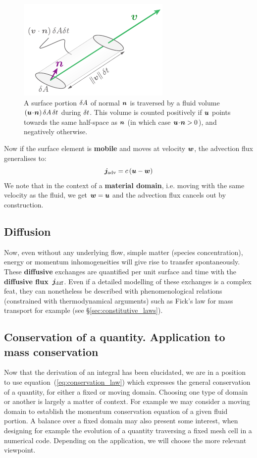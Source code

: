 \begin{figure}[htbp]
\begin{center}
\includegraphics{./pics/slanted_cylinder.pdf}
\caption{A surface portion $\delta A$ of normal $\bn$ is traversed by a fluid volume $\lp\bu \!\cdot\!\bn\rp\delA\,\delt$ during $\delta t$. This volume is counted positively if  $\bu$ points towards the same half-space as $\bn$ (in which case $\bu \!\cdot\! \bn > 0$), and negatively otherwise.}
\label{fig:slanted_cylinder}
\end{center}
\end{figure}
Now if the surface element is \textbf{mobile} and moves at velocity $\bw$, the advection flux generalises to: 
 \begin{equation}
\bj_\text{adv} = c\, (\bu-\bw)
\end{equation}
We note that in the context of a \textbf{material domain}, i.e. moving with the same velocity as the fluid, we get $\bw = \bu$ and the advection flux cancels out by construction.
\subsection{Diffusion}
Now, even without any underlying flow, simple matter (species concentration), energy or momentum inhomogeneities will give rise to transfer spontaneously. These \textbf{diffusive} exchanges are quantified per unit surface and time with the \textbf{diffusive flux}~$\bj_\text{diff}$. 
Even if a detailed modelling of these exchanges is a complex feat, they can nonetheless be described with phenomenological relations (constrained with thermodynamical arguments) such as Fick's law for mass transport for example (see \S\ref{sec:constitutive_laws}).

\subsection{Conservation of a quantity. Application to mass conservation}
Now that the derivation of an integral has been elucidated, we are in a position to use equation~(\ref{eq:conservation_law}) which expresses the general conservation of a quantity, for either a fixed or moving domain. Choosing one type of domain or another is largely a matter of context. For example we may consider a moving domain to establish the momentum conservation equation of a given fluid portion. A balance over a fixed domain may also present some interest, when designing for example the evolution of a quantity traversing a fixed mesh cell in a numerical code. Depending on the application, we will choose the more relevant viewpoint.

